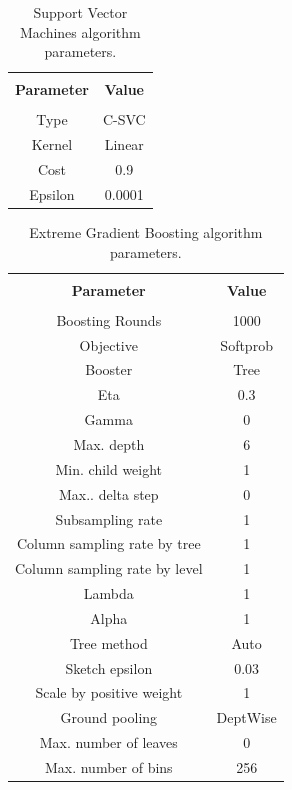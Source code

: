 \begin{table}[!ht]
	{\setlength{\tabcolsep}{12pt}
		\caption{Support Vector Machines algorithm parameters.}
		\begin{center}
			\vspace{-6mm}
			\begin{tabular}{cc}
				\hline \\[-2.45ex] \hline \\[-2.1ex]
				\textbf{Parameter} & \textbf{Value}\\
				\hline \\
				Type & C-SVC\\
				Kernel & Linear\\
				Cost & 0.9 \\
				Epsilon & 0.0001 \\
				\hline
			\end{tabular}
			\vspace{-6mm}
		\end{center}
		\label{svm}}
\end{table}

\begin{table}[!ht]
	{\setlength{\tabcolsep}{12pt}
		\caption{Extreme Gradient Boosting algorithm parameters.}
		\begin{center}
			\vspace{-6mm}
			\begin{tabular}{cc}
				\hline \\[-2.45ex] \hline \\[-2.1ex]
				\textbf{Parameter} & \textbf{Value}\\
				\hline \\
				Boosting Rounds & 1000 \\
				Objective & Softprob \\
				Booster & Tree \\
				Eta & 0.3 \\
				Gamma & 0 \\
				Max. depth & 6 \\
				Min. child weight & 1 \\
				Max.. delta step & 0 \\
				Subsampling rate & 1 \\
				Column sampling rate by tree & 1 \\
				Column sampling rate by level & 1 \\
				Lambda & 1 \\
				Alpha & 1 \\
				Tree method & Auto \\
				Sketch epsilon & 0.03 \\
				Scale by positive weight & 1 \\
				Ground pooling & DeptWise \\
				Max. number of leaves & 0 \\
				Max. number of bins & 256\\
				\hline			
			\end{tabular}
			\vspace{-6mm}
		\end{center}
		\label{xgboost}}
\end{table}


